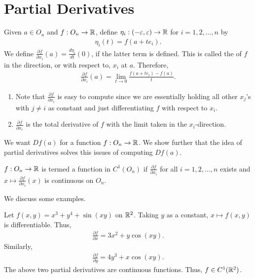 \section{Partial Derivatives}

Given $a \in O_{n}$ and $f:O_{n} \to \mathbb{R}$, define $\eta_{i} : (-\varepsilon,\varepsilon) \to \mathbb{R}$ for $i = 1,2,\ldots,n$ by
\begin{align}
    \eta_{i}(t) = f(a+te_{i}).
\end{align}
We define $\frac{\partial f}{\partial x_{i}}(a) = \frac{d\eta_{i}}{dt}(0)$, if the latter term is defined. This is called the  of $f$ in the direction, or with respect to, $x_{i}$ at $a$. Therefore,
\begin{align}
    \frac{\partial f}{\partial x_{i}}(a) = \lim_{t \to 0} \frac{f(a+te_{i}) - f(a)}{t}.
\end{align}

\begin{remark}
    \begin{enumerate}
        \item Note that $\frac{\partial f}{\partial x_{i}}$ is easy to compute since we are essentially holding all other $x_{j}$'s with $j \neq i$ as constant and just differentiating $f$ with respect to $x_{i}$.
        \item $\frac{\partial f}{\partial x_{i}}$ is the total derivative of $f$ with the limit taken in the $x_{i}$-direction.
    \end{enumerate}
\end{remark}

We want $Df(a)$ for a function $f:O_{n} \to \mathbb{R}$. We show further that the idea of partial derivatives solves this issues of computing $Df(a)$.

\begin{definition}
    $f:O_{n} \to \mathbb{R}$ is termed a function in $C^{1}(O_{n})$ if $\frac{\partial f}{\partial x_{i}}$ for all $i = 1,2,\ldots,n$ exists and $x \mapsto \frac{\partial f}{\partial x_{i}}(x)$ is continuous on $O_{n}$.
\end{definition}

We discuss some examples.

\begin{example}
    Let $f(x,y) = x^{3}+y^{4}+\sin(xy)$ on $\mathbb{R}^{2}$. Taking $y$ as a constant, $x \mapsto f(x,y)$ is differentiable. Thus,
    \begin{align}
        \frac{\partial f}{\partial x} = 3x^{2} + y \cos (xy).
    \end{align}
    Similarly,
    \begin{align}
        \frac{\partial f}{\partial y} = 4y^{3} + x \cos(xy).
    \end{align}
    The above two partial derivatives are continuous functions. Thus, $f \in C^{1}(\mathbb{R}^{2})$.
\end{example}

